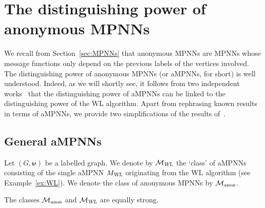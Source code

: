\section{The distinguishing power of anonymous MPNNs}
We recall from Section~\ref{sec:MPNNs} that anonymous MPNNs are MPNNs whose message functions
only depend on the previous labels of the vertices involved. The distinguishing power of anonymous MPNNs (or aMPNNs, for short) is well understood.
Indeed, as we will shortly see, it follows from two independent works~\cite{xhlj19,grohewl} that the distinguishing power of aMPNNs can be linked to the distinguishing power of the WL algorithm. Apart from rephrasing known results in terms of aMPNNs, we provide two simplifications of the results of~\cite{grohewl}.

\subsection{General aMPNNs}
Let $( G,\pmb{\nu})$ be a labelled graph.
We denote by $\mathcal{M}_{\textsl{WL}}$ the `class' of aMPNNs consisting of the single aMPNN $M_{\textsl{WL}}$ originating from the WL algorithm (see Example~\ref{ex:WL}). We denote the class of anonymous MPNNs by $\mathcal{M}_{\textsl{anon}}$.

\begin{theorem}\label{thm:eqstrongWL}
The classes $\mathcal{M}_{\textsl{anon}}$ and  $\mathcal{M}_{\textsl{WL}}$ are equally strong.
\end{theorem}


